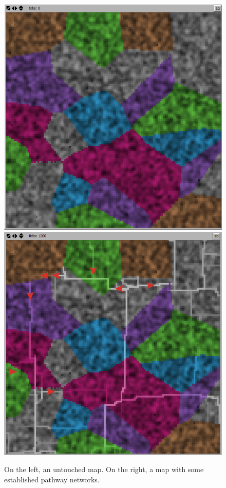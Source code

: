 \documentclass[conference]{IEEEtran}
\begin{document}
\begin{figure}[h]
\includegraphics[scale=0.25]{image/results1}
\includegraphics[scale=0.25]{image/results2}
\caption{On the left, an untouched map. On the right, a map with some established pathway networks.}
\end{figure}
\end{document}
